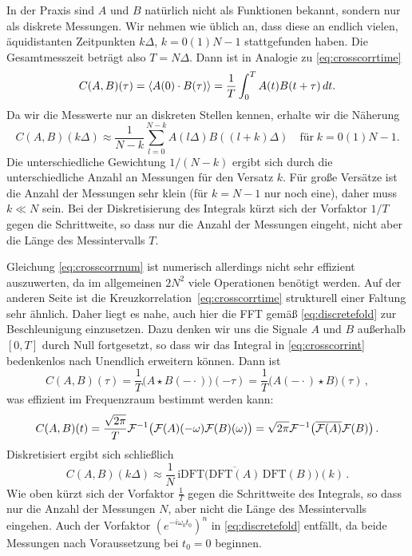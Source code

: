 In der Praxis sind $A$ und $B$ natürlich nicht als Funktionen bekannt,
sondern nur als diskrete Messungen. Wir nehmen wie üblich an, dass
diese an endlich vielen, äquidistanten Zeitpunkten $k\Delta$,
$k=0(1)N-1$ stattgefunden haben. Die Gesamtmesszeit beträgt also
$T=N\Delta$. Dann ist in Analogie zu \eqref{eq:crosscorrtime}
\begin{equation}
  \label{eq:crosscorrint}
  C(A,B)(\tau) = \left\langle{A(0)\cdot B(\tau)}\right\rangle
  = \frac{1}{T}\int_{0}^{T} A(t)B(t+\tau)\,dt.
\end{equation}
Da wir die Messwerte nur an diskreten Stellen kennen, erhalte wir die
Näherung
\begin{equation}
  \label{eq:crosscorrnum}
  C(A,B)(k\Delta)\approx
  \frac{1}{N-k}\sum_{l=0}^{N-k}A(l\Delta)B\left((l+k)\Delta\right)
  \quad\text{für}\; k=0(1)N-1.
\end{equation}
Die unterschiedliche Gewichtung $1/(N-k)$ ergibt sich durch die
unterschiedliche Anzahl an Messungen für den Versatz $k$. Für große
Versätze ist die Anzahl der Messungen sehr klein (für $k=N-1$ nur noch
eine), daher muss $k \ll N$ sein. Bei der Diskretisierung des
Integrals kürzt sich der Vorfaktor $1/T$ gegen die Schrittweite, so
dass nur die Anzahl der Messungen eingeht, nicht aber die Länge des
Messintervalls $T$.

Gleichung \eqref{eq:crosscorrnum} ist numerisch allerdings nicht sehr
effizient auszuwerten, da im allgemeinen $2N^2$ viele Operationen
benötigt werden. Auf der anderen Seite ist die
Kreuzkorrelation~\eqref{eq:crosscorrtime} strukturell einer Faltung
sehr ähnlich.  Daher liegt es nahe, auch hier die FFT gemäß
\eqref{eq:discretefold} zur Beschleunigung einzusetzen. Dazu denken
wir uns die Signale $A$ und $B$ außerhalb $[0,T]$ durch Null
fortgesetzt, so dass wir das Integral in \eqref{eq:crosscorrint}
bedenkenlos nach Unendlich erweitern können. Dann ist
\begin{equation}
  C(A,B)(\tau) = \frac{1}{T}\bigl(A \star B(-\cdot)\bigr)(-\tau) =
  \frac{1}{T} \bigl(A(-\cdot) \star B\bigr)(\tau)\,,
\end{equation}
was effizient im Frequenzraum bestimmt werden kann:
\begin{equation}
  \label{eq:crosscorrfft}
  C(A,B)(t) = \frac{\sqrt{2\pi}}{T}\mathcal F^{-1}
  \bigl(\mathcal F(A)(-\omega)\mathcal F(B)(\omega)\bigr) = \sqrt{2\pi}\mathcal F^{-1}
  \bigl(\overline{\mathcal F(A)}\mathcal F(B)\bigr)\,.
\end{equation}
Diskretisiert ergibt sich schließlich
\begin{equation}
  \label{eq:crosscorrnumfft}
  C(A,B)(k\Delta)
  \approx
  \frac{1}{N}\,\text{iDFT}
  \bigl(\overline{\text{DFT}(A)}\,\text{DFT}(B)\bigr)(k)\,.
\end{equation}
Wie oben kürzt sich der Vorfaktor $\frac{1}{T}$ gegen die Schrittweite
des Integrals, so dass nur die Anzahl der Messungen $N$, aber nicht
die Länge des Messintervalls eingehen. Auch der Vorfaktor
$\left(e^{-i\omega_0 t_0}\right)^n$ in \eqref{eq:discretefold}
entfällt, da beide Messungen nach Voraussetzung bei $t_0=0$ beginnen.

